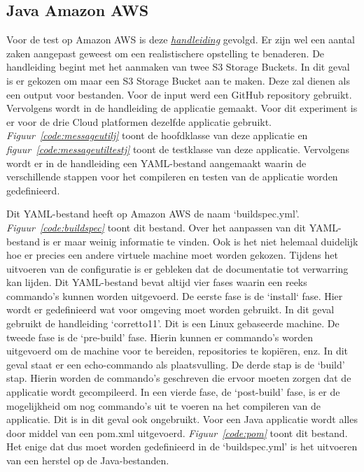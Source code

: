 \subsection{Java Amazon AWS}
\label{sec:JAA}
Voor de test op Amazon AWS is deze \emph{\href{https://docs.aws.amazon.com/codebuild/latest/userguide/getting-started.html}{handleiding}} gevolgd. Er zijn wel een aantal zaken aangepast geweest om een realistischere opstelling te benaderen. De handleiding begint met het aanmaken van twee S3 Storage Buckets. In dit geval is er gekozen om maar een S3 Storage Bucket aan te maken. Deze zal dienen als een output voor bestanden. Voor de input werd een GitHub repository gebruikt. Vervolgens wordt in de handleiding de applicatie gemaakt. Voor dit experiment is er voor de drie Cloud platformen dezelfde applicatie gebruikt. \emph{Figuur~\ref{code:messageutilj}} toont de hoofdklasse van deze applicatie en \emph{figuur~\ref{code:messageutiltestj}} toont de testklasse van deze applicatie. Vervolgens wordt er in de handleiding een YAML-bestand aangemaakt waarin de verschillende stappen voor het compileren en testen van de applicatie worden gedefinieerd.

Dit YAML-bestand heeft op Amazon AWS de naam ‘buildspec.yml’. \emph{Figuur~\ref{code:buildspec}} toont dit bestand. Over het aanpassen van dit YAML-bestand is er maar weinig informatie te vinden. Ook is het niet helemaal duidelijk hoe er precies een andere virtuele machine moet worden gekozen. Tijdens het uitvoeren van de configuratie is er gebleken dat de documentatie tot verwarring kan lijden. Dit YAML-bestand bevat altijd vier fases waarin een reeks commando’s kunnen worden uitgevoerd. De eerste fase is de ‘install‘ fase. Hier wordt er gedefinieerd wat voor omgeving moet worden gebruikt. In dit geval gebruikt de handleiding ‘corretto11’. Dit is een Linux gebaseerde machine. De tweede fase is de ‘pre-build’ fase. Hierin kunnen er commando’s worden uitgevoerd om de machine voor te bereiden, repositories te kopiëren, enz. In dit geval staat er een echo-commando als plaatsvulling. De derde stap is de ‘build’ stap. Hierin worden de commando’s geschreven die ervoor moeten zorgen dat de applicatie wordt gecompileerd. In een vierde fase, de ‘post-build’ fase, is er de mogelijkheid om nog commando’s uit te voeren na het compileren van de applicatie. Dit is in dit geval ook ongebruikt. Voor een Java applicatie wordt alles door middel van een pom.xml uitgevoerd. \emph{Figuur~\ref{code:pom}} toont dit bestand. Het enige dat dus moet worden gedefinieerd in de ‘buildspec.yml’ is het uitvoeren van een herstel op de Java-bestanden.

